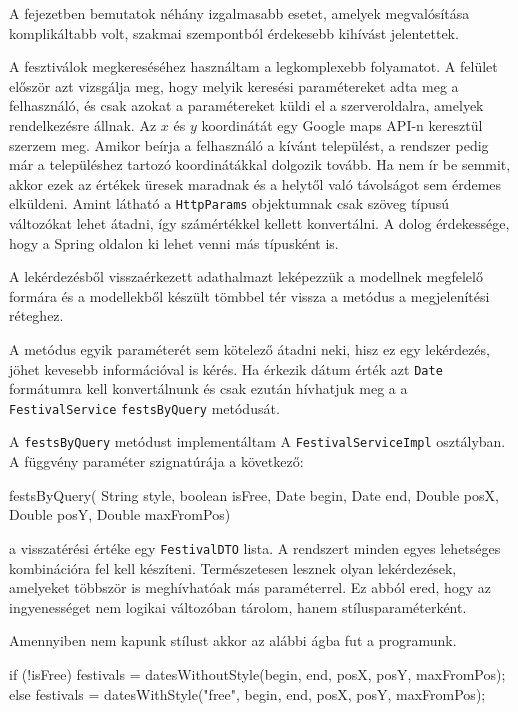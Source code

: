 
A fejezetben bemutatok néhány izgalmasabb esetet, amelyek megvalósítása komplikáltabb volt, szakmai szempontból érdekesebb kihívást jelentettek.


A fesztiválok megkereséséhez használtam a legkomplexebb folyamatot. A felület először azt vizsgálja meg, hogy melyik keresési paramétereket adta meg a felhasználó, és csak azokat a paramétereket küldi el a szerveroldalra, amelyek rendelkezésre állnak. Az $x$ és $y$ koordinátát egy Google maps API-n keresztül szerzem meg. Amikor beírja a felhasználó a kívánt települést, a rendszer pedig már a településhez tartozó koordinátákkal dolgozik tovább. Ha nem ír be semmit, akkor ezek az értékek üresek maradnak és a helytől való távolságot sem érdemes elküldeni. Amint látható a \texttt{HttpParams} objektumnak csak szöveg típusú változókat lehet átadni, így számértékkel kellett konvertálni. A dolog érdekessége, hogy a Spring oldalon ki lehet venni más típusként is.

A lekérdezésből visszaérkezett adathalmazt leképezzük a modellnek megfelelő formára és a modellekből készült tömbbel tér vissza a metódus a megjelenítési réteghez.

A metódus egyik paraméterét sem kötelező átadni neki, hisz ez egy lekérdezés, jöhet kevesebb információval is kérés. Ha érkezik dátum érték azt \texttt{Date} formátumra kell konvertálnunk és csak ezután hívhatjuk meg a a \texttt{FestivalService} \texttt{festsByQuery} metódusát.

A \texttt{festsByQuery} metódust implementáltam A \texttt{FestivalServiceImpl} osztályban. A függvény paraméter szignatúrája a következő:
\begin{java}
festsByQuery(
    String style,
    boolean isFree,
    Date begin, Date end,
    Double posX, Double posY,
    Double maxFromPos)
\end{java}
a visszatérési értéke egy \texttt{FestivalDTO} lista. A rendszert minden egyes lehetséges kombinációra fel kell készíteni. Természetesen lesznek olyan lekérdezések, amelyeket többször is meghívhatóak más paraméterrel. Ez abból ered, hogy az ingyenességet nem logikai változóban tárolom, hanem stílusparaméterként.

Amennyiben nem kapunk stílust akkor az alábbi ágba fut a programunk.
\begin{java}
if (!isFree) {
    festivals =
        datesWithoutStyle(begin, end, posX, posY, 
maxFromPos);
} else {
    festivals = datesWithStyle("free", begin, end, posX, posY,
    maxFromPos);
}
\end{java}

